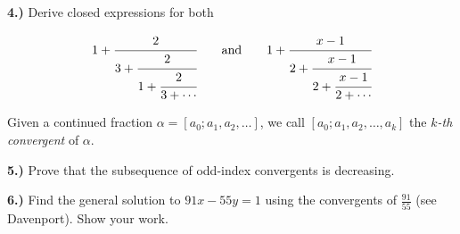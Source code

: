 \documentclass[10pt]{amsart}
\begin{document}
{\bf 4.)} Derive closed expressions for both

\[
1 + \cfrac{2}{3+\cfrac{2}{1+\cfrac{2}{3+\dotsb}}} \quad \quad \text{and} \quad \quad 1 + \cfrac{x-1}{2+\cfrac{x-1}{2+\cfrac{x-1}{2+\dotsb}}}
\]

\medskip

\noindent Given a continued fraction $\alpha = [a_0; a_1, a_2, \dotsc]$, we call $[a_0; a_1, a_2, \dotsc, a_k]$ the \emph{$k$-th convergent} of $\alpha$.

\medskip

{\bf 5.)} Prove that the subsequence of odd-index convergents is decreasing.

\medskip

{\bf 6.)} Find the general solution to $91x - 55y = 1$ using the convergents of $\frac{91}{55}$ (see Davenport). Show your work.
\end{document}
